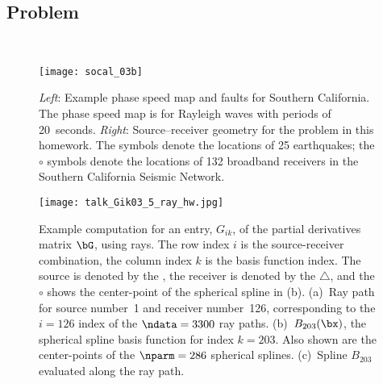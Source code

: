 \documentclass[11pt,titlepage,fleqn]{article}
\begin{document}

\subsection*{Problem} \howmuchtime\



\clearpage\pagebreak

\begin{figure}
\hspace{-0.5cm}
\texttt{[image: socal\_03b]}
\caption[Source--receiver geometry for southern California]
{{
{\em Left}: Example phase speed map and faults for Southern California. The phase speed map is for Rayleigh waves with periods of 20~seconds.
{\em Right}: Source--receiver geometry for the problem in this homework. The  symbols denote the locations of 25 earthquakes; the $\circ$ symbols denote the locations of 132 broadband receivers in the Southern California Seismic Network.
\label{fig:geometry}
}}
\end{figure}

\begin{figure}[p]
\hspace{-1.5cm}
\texttt{[image: talk\_Gik03\_5\_ray\_hw.jpg]}
\caption[Basis function]
{{
Example computation for an entry, $G_{ik}$, of the partial derivatives matrix $\bG$, using rays. The row index $i$ is the source-receiver combination, the column index $k$ is the basis function index. The source is denoted by the , the receiver is denoted by the $\triangle$, and the $\circ$ shows the center-point of the spherical spline in (b).
(a)~Ray path for source number~1 and receiver number~126, corresponding to the $i=126$ index of the $\ndata=3300$ ray paths.
(b)~$B_{203}(\bx)$, the spherical spline basis function for index $k=203$. Also shown are the center-points of the $\nparm=286$ spherical splines.
(c)~Spline $B_{203}$ evaluated along the ray path.
\label{fig:basis}
}}
\end{figure}

\end{document}
